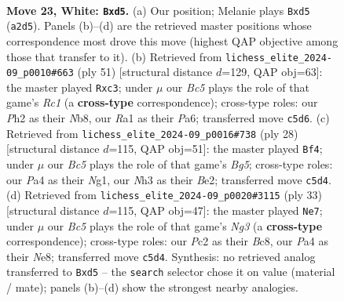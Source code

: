 \documentclass[11pt]{article}
\begin{document}
\clearpage

\begin{figure}[p]\centering
\begin{subfigure}{0.46\textwidth}\centering
\resizebox{\linewidth}{!}{%
\newchessgame
\chessboard[
  setfen={2bqnkr1/1r2bp2/p5p1/n1Bpp2p/P3P3/3PQ2N/BPP2PPP/RN2R1K1 w - - 1 23},
  showmover=false,
  pgfstyle=straightmove, color=movearrow, markmove={a2-d5}
]}
\caption{}
\end{subfigure}\hfill
\begin{subfigure}{0.46\textwidth}\centering
\resizebox{\linewidth}{!}{%
\newchessgame
\chessboard[
  setfen={1nrqr1k1/5pp1/p2b1nbp/1p1P4/4p3/PNR1B1PP/NPQ2PB1/3R2K1 b - - 3 26},
  showmover=false,
  pgfstyle=straightmove, color=movearrow, markmove={c8-c3}
]}
\caption{}
\end{subfigure}
\\[4pt]
\begin{subfigure}{0.46\textwidth}\centering
\resizebox{\linewidth}{!}{%
\newchessgame
\chessboard[
  setfen={rnbqr1k1/1p3pb1/p2p1npp/P1pP2B1/4P3/N4P2/1P1QB1PP/R3K1NR w KQ - 0 15},
  showmover=false,
  pgfstyle=straightmove, color=movearrow, markmove={g5-f4}
]}
\caption{}
\end{subfigure}\hfill
\begin{subfigure}{0.46\textwidth}\centering
\resizebox{\linewidth}{!}{%
\newchessgame
\chessboard[
  setfen={r1bqnrk1/pp3ppp/1bp3n1/3p2P1/2P4P/PPN1P3/1BQ1BP2/2KRN2R b - - 0 17},
  showmover=false,
  pgfstyle=straightmove, color=movearrow, markmove={g6-e7}
]}
\caption{}
\end{subfigure}
\caption{\textbf{Move 23, White: \texttt{Bxd5}.} (a) Our position; Melanie plays \texttt{Bxd5} (\texttt{a2d5}). Panels (b)--(d) are the retrieved master positions whose correspondence most drove this move (highest QAP objective among those that transfer to it). (b) Retrieved from \texttt{lichess\_elite\_2024-09\_p0010\#663} (ply 51) [structural distance $d$=129, QAP obj=63]: the master played \texttt{Rxc3}; under $\mu$ our \emph{Bc5} plays the role of that game's \emph{Rc1} (a \textbf{cross-type} correspondence); cross-type roles: our \emph{P}h2 as their \emph{N}b8, our \emph{R}a1 as their \emph{P}a6; transferred move \texttt{c5d6}. (c) Retrieved from \texttt{lichess\_elite\_2024-09\_p0016\#738} (ply 28) [structural distance $d$=115, QAP obj=51]: the master played \texttt{Bf4}; under $\mu$ our \emph{Bc5} plays the role of that game's \emph{Bg5}; cross-type roles: our \emph{P}a4 as their \emph{N}g1, our \emph{N}h3 as their \emph{B}e2; transferred move \texttt{c5d4}. (d) Retrieved from \texttt{lichess\_elite\_2024-09\_p0020\#3115} (ply 33) [structural distance $d$=115, QAP obj=47]: the master played \texttt{Ne7}; under $\mu$ our \emph{Bc5} plays the role of that game's \emph{Ng3} (a \textbf{cross-type} correspondence); cross-type roles: our \emph{P}c2 as their \emph{B}c8, our \emph{P}a4 as their \emph{N}e8; transferred move \texttt{c5d4}. Synthesis: no retrieved analog transferred to \texttt{Bxd5} -- the \texttt{search} selector chose it on value (material / mate); panels (b)--(d) show the strongest nearby analogies.}
\label{fig:thought-m44}
\end{figure}
\end{document}
